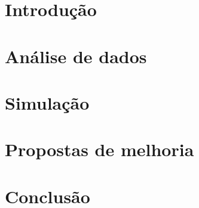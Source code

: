 \documentclass[11pt]{article}
\begin{document}



\newpage{}
\tableofcontents{}
\newpage{}

\section{Introdução}
\label{section: intro}


\section{Análise de dados}









\section{Simulação}
\label{section: simulacao}




\section{Propostas de melhoria}
\label{section: propostas}


\section{Conclusão}
\label{section: conclusao}

\end{document}
